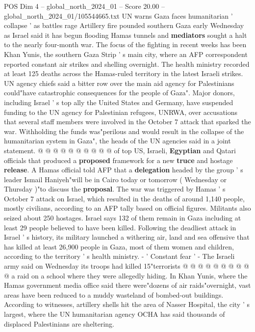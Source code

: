 \begin{textsample}{POS Dim 4 – global\_north\_2024\_01 – Score 20.00 – global\_north\_2024\_01/105544665.txt}  \label{ex:f4_pos_343}
UN warns Gaza faces humanitarian ' collapse ' as battles rage Artillery fire pounded southern Gaza early Wednesday as Israel said it has begun flooding Hamas tunnels and \textbf{mediators} sought a halt to the nearly four-month war.
The focus of the fighting in recent weeks has been Khan Yunis, the southern Gaza Strip ' s main city, where an AFP correspondent reported constant air strikes and shelling overnight.
The health ministry recorded at least 125 deaths across the Hamas-ruled territory in the latest Israeli strikes.
UN agency chiefs said a bitter row over the main aid agency for Palestinians could"have catastrophic consequences for the people of Gaza".
Major donors, including Israel ' s top ally the United States and Germany, have suspended funding to the UN agency for Palestinian refugees, UNRWA, over accusations that several staff members were involved in the October 7 attack that sparked the war.
Withholding the funds was"perilous and would result in the collapse of the humanitarian system in Gaza", the heads of the UN agencies said in a joint statement. @ @ @ @ @ @ @ @ @ @ of top US, Israeli, \textbf{Egyptian} and Qatari officials that produced a \textbf{proposed} framework for a new \textbf{truce} and hostage \textbf{release}.
A Hamas official told AFP that a \textbf{delegation} headed by the group ' s leader Ismail Haniyeh"will be in Cairo today or tomorrow ( Wednesday or Thursday )"to discuss the \textbf{proposal}.
The war was triggered by Hamas ' s October 7 attack on Israel, which resulted in the deaths of around 1,140 people, mostly civilians, according to an AFP tally based on official figures.
Militants also seized about 250 hostages.
Israel says 132 of them remain in Gaza including at least 29 people believed to have been killed.
Following the deadliest attack in Israel ' s history, its military launched a withering air, land and sea offensive that has killed at least 26,900 people in Gaza, most of them women and children, according to the territory ' s health ministry. - ' Constant fear ' - The Israeli army said on Wednesday its troops had killed 15"terrorists @ @ @ @ @ @ @ @ @ @ a raid on a school where they were allegedly hiding.
In Khan Yunis, where the Hamas government media office said there were"dozens of air raids"overnight, vast areas have been reduced to a muddy wasteland of bombed-out buildings.
According to witnesses, artillery shells hit the area of Nasser Hospital, the city ' s largest, where the UN humanitarian agency OCHA has said thousands of displaced Palestinians are sheltering.

\end{textsample}
